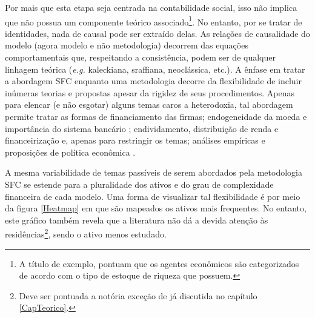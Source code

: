 Por mais que esta etapa seja centrada na contabilidade social, isso não implica que não possua um componente teórico associado\footnote{A título de exemplo, \textcite[p.~15--16]{macedo_e_silva_peering_2011}  pontuam que %
	os agentes econômicos são categorizados de acordo com o tipo de estoque de riqueza que possuem.
}. 
No entanto, por se tratar de identidades, nada de causal pode ser extraído delas. As relações de causalidade do modelo (agora modelo e não metodologia) decorrem das equações comportamentais que, respeitando a consistência, podem ser de qualquer linhagem teórica (\textit{e.g.} kaleckiana, sraffiana, neoclássica, etc.). A ênfase em tratar a abordagem SFC enquanto uma metodologia decorre da flexibilidade de incluir inúmeras teorias e propostas apesar da rigidez de seus procedimentos. Apenas para elencar (e não esgotar) alguns temas caros a heterodoxia, tal abordagem permite tratar as formas de financiamento das firmas; endogeneidade da moeda e importância do sistema bancário \cites{godley_money_1999}{lavoie_note_1999}; endividamento, distribuição de renda e financeirização \cites{dos_santos_revisiting_2009}{palley_inside_2010}{hein_finance-dominated_2012} e, apenas para restringir os temas; análises empíricas e proposições de política econômica \cites{godley_seven_1999}{godley_fiscal_2007}{godley_simple_2007}{arestis_income_2011}. 

A mesma variabilidade de temas passíveis de serem abordados pela metodologia SFC se estende para a pluralidade dos ativos e do grau de complexidade financeira de cada modelo. Uma forma de visualizar tal flexibilidade é por meio da figura \ref{Heatmap} em que são mapeados os ativos mais frequentes. No entanto, este gráfico também revela que a literatura não dá a devida atenção às residências\footnote{Deve ser pontuada a notória exceção de \textcite{zezza_u.s._2008} já discutida no capítulo \ref{CapTeorico}.}, sendo o ativo menos estudado. 


